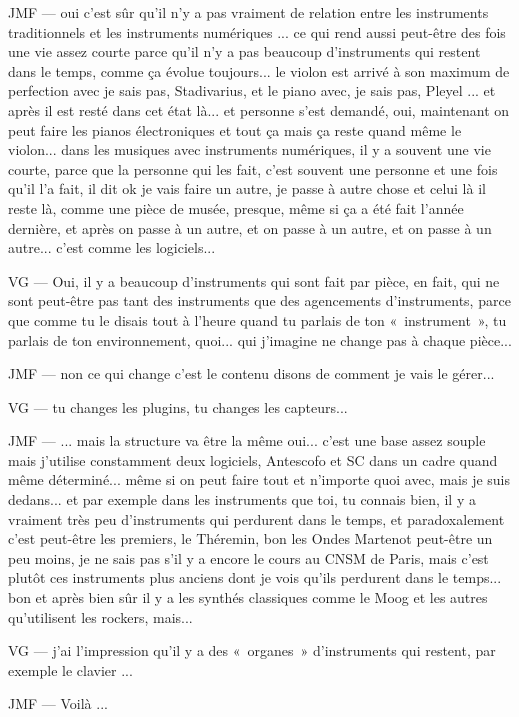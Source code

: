 JMF — oui c'est sûr qu'il n'y a pas vraiment de relation entre les instruments traditionnels et les instruments numériques ... ce qui rend aussi peut-être des fois une vie assez courte parce qu'il n'y a pas beaucoup d'instruments qui restent dans le temps, comme ça évolue toujours... le violon est arrivé à son maximum de perfection avec je sais pas, Stadivarius, et le piano avec, je sais pas, Pleyel ... et après il est resté dans cet état là... et personne s'est demandé, oui, maintenant on peut faire les pianos électroniques et tout ça mais ça reste quand même le violon... dans les musiques avec instruments numériques, il y a souvent une vie courte, parce que la personne qui les fait, c'est souvent une personne et une fois qu'il l'a fait, il dit ok je vais faire un autre, je passe à autre chose et celui là il reste là, comme une pièce de musée, presque, même si ça a été fait l'année dernière, et après on passe à un autre, et on passe à un autre, et on passe à un autre... c'est comme les logiciels... 

VG — Oui, il y a beaucoup d'instruments qui sont fait par pièce, en fait, qui ne sont peut-être pas tant des instruments que des agencements d'instruments, parce que comme tu le disais tout à l'heure quand tu parlais de ton « instrument », tu parlais de ton environnement, quoi... qui j'imagine ne change pas à chaque pièce...  

JMF — non ce qui change c'est le contenu disons de comment je vais le gérer... 

VG — tu changes les plugins, tu changes les capteurs... 

JMF — ... mais la structure va être la même oui... c'est une base assez souple mais j'utilise constamment deux logiciels, Antescofo et SC dans un cadre quand même déterminé... même si on peut faire tout et n'importe quoi avec, mais je suis dedans... et par exemple dans les instruments que toi, tu connais bien, il y a vraiment très peu d'instruments qui perdurent dans le temps, et paradoxalement c'est peut-être les premiers, le Théremin, bon les Ondes Martenot peut-être un peu moins, je ne sais pas s'il y a encore le cours au CNSM de Paris, mais c'est plutôt ces instruments plus anciens dont je vois qu'ils perdurent dans le temps... bon et après bien sûr il y a les synthés classiques comme le Moog et les autres qu'utilisent les rockers, mais... 

VG — j'ai l'impression qu'il y a des « organes » d'instruments qui restent, par exemple le clavier ... 

JMF — Voilà ...  

